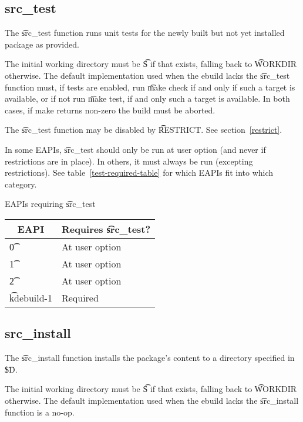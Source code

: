 \subsection{src\_test}
\label{src-test-function}

The \t{src\_test} function runs unit tests for the newly built but not yet installed package as
provided.

The initial working directory must be \t{S} if that exists, falling back to \t{WORKDIR} otherwise.
The default implementation used when the ebuild lacks the \t{src\_test} function must, if tests are
enabled, run \t{make check} if and only if such a target is available, or if not run \t{make test},
if and only such a target is available. In both cases, if make returns non-zero the build must be
aborted.

The \t{src\_test} function may be disabled by \t{RESTRICT}. See section~\ref{restrict}.

\IFKDEBUILDELSE
{
    In some EAPIs, \t{src\_test} should only be run at user option (and never if restrictions are in
    place). In others, it must always be run (excepting restrictions). See table~\ref{test-required-table}
    for which EAPIs fit into which category.

    \begin{centertable}{EAPIs requiring \t{src\_test}} \label{test-required-table}
    \begin{tabular}{ l l }
        \toprule
        \multicolumn{1}{c}{\textbf{EAPI}} &
        \multicolumn{1}{c}{\textbf{Requires \t{src\_test}?}} \\
        \midrule
    \t{0} & At user option \\
    \t{1} & At user option \\
    \t{2} & At user option \\
    \t{kdebuild-1} & Required \\
    \bottomrule
    \end{tabular}

    \end{centertable}
}{
}

\subsection{src\_install}
\label{src-install-function}

The \t{src\_install} function installs the package's content to a directory specified in
\t{\${D}}.

The initial working directory must be \t{S} if that exists, falling back to \t{WORKDIR} otherwise.
The default implementation used when the ebuild lacks the \t{src\_install} function is a no-op.

